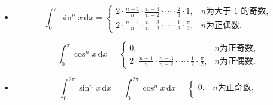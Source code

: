 \documentclass[a4paper,12pt]{article}
\begin{document}
\begin{enumerate}
\begin{itemize}
\[\begin{cases}
                          \displaystyle
                          \frac{n-1}{n}
                          \cdot
                          \frac{n-3}{n-2}
                          \cdot
                          \cdots
                          \cdot
                          \frac{1}{2}
                          \cdot
                          \frac{\pi}{2},
                          & n \text{为正偶数}.
                      \end{cases}
            \]

            \item
            \[
                \int_{0}^{\pi} \sin^{n} x \,\mathrm{d}x
                =
                \begin{cases}
                    \displaystyle
                    2
                    \cdot
                    \frac{n-1}{n}
                    \cdot
                    \frac{n-3}{n-2}
                    \cdot
                    \cdots
                    \cdot
                    \frac{2}{3}
                    \cdot
                    1,
                    & n \text{为大于 1 的奇数}, \\[1.2em]

                    \displaystyle
                    2
                    \cdot
                    \frac{n-1}{n}
                    \cdot
                    \frac{n-3}{n-2}
                    \cdot
                    \cdots
                    \cdot
                    \frac{1}{2}
                    \cdot
                    \frac{\pi}{2},
                    & n \text{为正偶数}.
                \end{cases}
            \]

            \[
                \int_{0}^{\pi} \cos^{n} x \,\mathrm{d}x
                =
                \begin{cases}
                    0,
                    & n \text{为正奇数}, \\[0.8em]

                    \displaystyle
                    2
                    \cdot
                    \frac{n-1}{n}
                    \cdot
                    \frac{n-3}{n-2}
                    \cdot
                    \cdots
                    \cdot
                    \frac{1}{2}
                    \cdot
                    \frac{\pi}{2},
                    & n \text{为正偶数}.
                \end{cases}
            \]

            \item
            \[
                \int_{0}^{2\pi} \sin^{n} x \,\mathrm{d}x
                =
                \int_{0}^{2\pi} \cos^{n} x \,\mathrm{d}x
                =
                \begin{cases}
                    0,
                    & n \text{为正奇数}, \\[0.8em]


\end{cases}\]
\end{itemize}
\end{enumerate}
\end{document}
